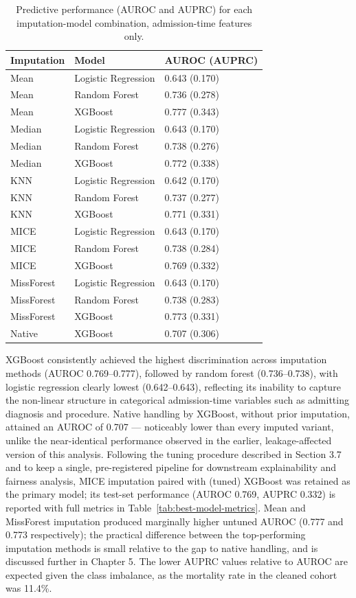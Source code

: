\documentclass[12pt,a4paper]{report}
\begin{document}
\begin{table}[H]
\centering
\caption{Predictive performance (AUROC and AUPRC) for each imputation-model combination, admission-time features only.}
\label{tab:baseline-perf}
\small
\begin{tabular}{lll}
\toprule
Imputation & Model & AUROC (AUPRC) \\
\midrule
Mean & Logistic Regression & 0.643 (0.170) \\
Mean & Random Forest & 0.736 (0.278) \\
Mean & XGBoost & 0.777 (0.343) \\
Median & Logistic Regression & 0.643 (0.170) \\
Median & Random Forest & 0.738 (0.276) \\
Median & XGBoost & 0.772 (0.338) \\
KNN & Logistic Regression & 0.642 (0.170) \\
KNN & Random Forest & 0.737 (0.277) \\
KNN & XGBoost & 0.771 (0.331) \\
MICE & Logistic Regression & 0.643 (0.170) \\
MICE & Random Forest & 0.738 (0.284) \\
MICE & XGBoost & 0.769 (0.332) \\
MissForest & Logistic Regression & 0.643 (0.170) \\
MissForest & Random Forest & 0.738 (0.283) \\
MissForest & XGBoost & 0.773 (0.331) \\
Native & XGBoost & 0.707 (0.306) \\
\bottomrule
\end{tabular}
\end{table}


XGBoost consistently achieved the highest discrimination across imputation methods (AUROC 0.769--0.777), followed by random forest (0.736--0.738), with logistic regression clearly lowest (0.642--0.643), reflecting its inability to capture the non-linear structure in categorical admission-time variables such as admitting diagnosis and procedure. Native handling by XGBoost, without prior imputation, attained an AUROC of 0.707 --- noticeably lower than every imputed variant, unlike the near-identical performance observed in the earlier, leakage-affected version of this analysis. Following the tuning procedure described in Section 3.7 and to keep a single, pre-registered pipeline for downstream explainability and fairness analysis, MICE imputation paired with (tuned) XGBoost was retained as the primary model; its test-set performance (AUROC 0.769, AUPRC 0.332) is reported with full metrics in Table~\ref{tab:best-model-metrics}. Mean and MissForest imputation produced marginally higher untuned AUROC (0.777 and 0.773 respectively); the practical difference between the top-performing imputation methods is small relative to the gap to native handling, and is discussed further in Chapter 5. The lower AUPRC values relative to AUROC are expected given the class imbalance, as the mortality rate in the cleaned cohort was 11.4\%.
\end{document}
